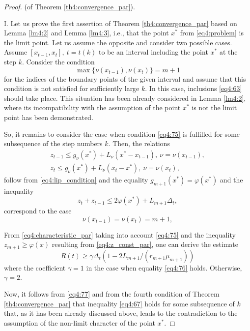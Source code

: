 \begin{proof} (of Theorem \ref{th4:convergence_par}).

  I. Let us prove the first assertion of Theorem \ref{th4:convergence_par} based on Lemma \ref{lm4:2} and Lemma \ref{lm4:3}, i.e., that the point $x^*$ from \eqref{eq4:problem} is the limit point. Let us assume the opposite and consider two  possible cases. Assume $[x_{t-1},x_t],\: t=t(k)$ to be an interval including the point $x^*$ at the step $k$. Consider the condition
  \begin{equation}
    \label{eq4:75}
    \max\{\nu(x_{t-1}),\nu(x_t)\}=m+1
  \end{equation}
  for the indices of the boundary points of the given interval and assume that this condition is not satisfied for sufficiently large $k$. In this case, inclusions \eqref{eq4:63} should take place. This situation has been already considered in Lemma \ref{lm4:2}, where its incompatibility with the assumption of the point $x^*$ is not the limit point has been demonstrated.

  So, it remains to consider the case when condition \eqref{eq4:75} is fulfilled for some subsequence of the step numbers $k$. Then, the relations
  \begin{gather}
    z_{t-1}\le g_\nu(x^*)+L_\nu(x^*-x_{t-1}),\: \nu=\nu(x_{t-1}), \nonumber \\
    z_t\le g_\nu(x^*)+L_\nu(x_t-x^*),\: \nu=\nu(x_t), \nonumber
  \end{gather}
  follow from \eqref{eq4:lip_condition} and the equality $g_{m+1}(x^*)=\varphi(x^*)$ and the inequality
  \begin{displaymath}
    z_t+z_{t-1}\le 2\varphi(x^*)+L_{m+1}\Delta_t,
  \end{displaymath}
  correspond to the case
  \begin{equation}
    \label{eq4:76}
    \nu(x_{t-1})=\nu(x_t)=m+1,
  \end{equation}

  From \eqref{eq4:characteristic_par} taking into account \eqref{eq4:75} and the inequality $z_{m + 1}\ge \varphi(x)$ resulting from \eqref{eq4:z_const_par}, one can derive the estimate
  \begin{equation}
    \label{eq4:77}
    R(t)\ge \gamma\Delta_t(1-2L_{m+1}/(r_{m+1}\mu_{m+1}))
  \end{equation}
  where the coefficient $\gamma=1$ in the case when equality \eqref{eq4:76} holds. Otherwise, $\gamma= 2$.

  Now, it follows from \eqref{eq4:77} and from the fourth condition of Theorem \ref{th4:convergence_par} that inequality \eqref{eq4:67} holds for some subsequence of $k$ that, as it has been already discussed above, leads to the contradiction to the assumption of the non-limit character of the point $x^*$.


\end{proof}
